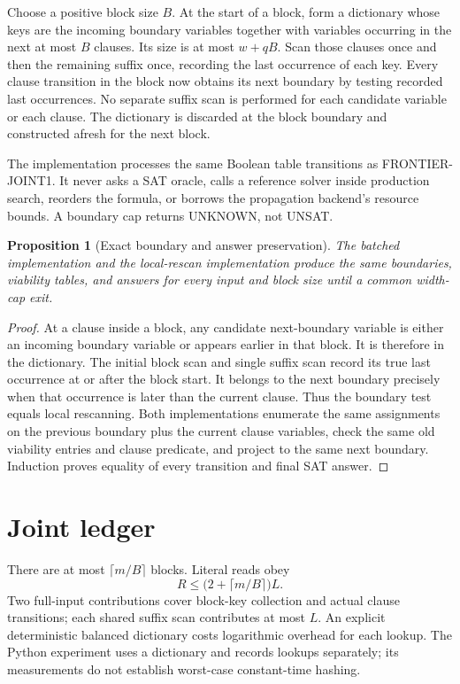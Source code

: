 \documentclass[11pt]{article}
\newtheorem{proposition}{Proposition}
\begin{document}
Choose a positive block size $B$. At the start of a block, form a dictionary whose keys are the incoming boundary variables together with variables occurring in the next at most $B$ clauses. Its size is at most $w+qB$. Scan those clauses once and then the remaining suffix once, recording the last occurrence of each key. Every clause transition in the block now obtains its next boundary by testing recorded last occurrences. No separate suffix scan is performed for each candidate variable or each clause. The dictionary is discarded at the block boundary and constructed afresh for the next block.

The implementation processes the same Boolean table transitions as FRONTIER-JOINT1. It never asks a SAT oracle, calls a reference solver inside production search, reorders the formula, or borrows the propagation backend's resource bounds. A boundary cap returns UNKNOWN, not UNSAT.

\begin{proposition}[Exact boundary and answer preservation]
The batched implementation and the local-rescan implementation produce the same boundaries, viability tables, and answers for every input and block size until a common width-cap exit.
\end{proposition}
\begin{proof}
At a clause inside a block, any candidate next-boundary variable is either an incoming boundary variable or appears earlier in that block. It is therefore in the dictionary. The initial block scan and single suffix scan record its true last occurrence at or after the block start. It belongs to the next boundary precisely when that occurrence is later than the current clause. Thus the boundary test equals local rescanning. Both implementations enumerate the same assignments on the previous boundary plus the current clause variables, check the same old viability entries and clause predicate, and project to the same next boundary. Induction proves equality of every transition and final SAT answer.
\end{proof}

\section{Joint ledger}
There are at most $\lceil m/B\rceil$ blocks. Literal reads obey
\[
R\le \bigl(2+\lceil m/B\rceil\bigr)L.
\]
Two full-input contributions cover block-key collection and actual clause transitions; each shared suffix scan contributes at most $L$. An explicit deterministic balanced dictionary costs logarithmic overhead for each lookup. The Python experiment uses a dictionary and records lookups separately; its measurements do not establish worst-case constant-time hashing.
\end{document}
